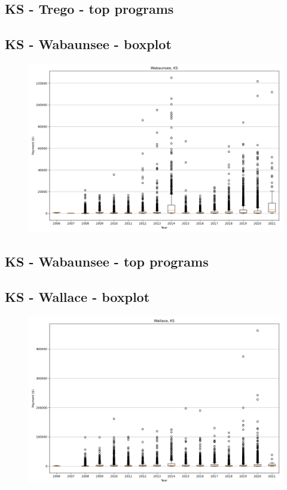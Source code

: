\subsection*{KS - Trego - top programs}

\newpage
\subsection*{KS - Wabaunsee - boxplot}
\begin{figure}[h]
\centering
\includegraphics[width=7in]{../output/boxplots/counties/Wabaunsee-KS_boxplot.png}
\end{figure}


\subsection*{KS - Wabaunsee - top programs}

\newpage
\subsection*{KS - Wallace - boxplot}
\begin{figure}[h]
\centering
\includegraphics[width=7in]{../output/boxplots/counties/Wallace-KS_boxplot.png}
\end{figure}


